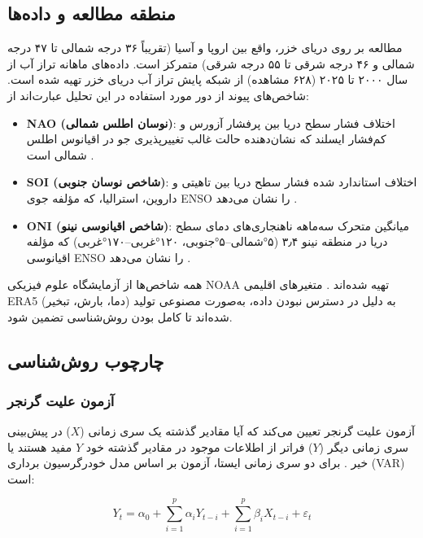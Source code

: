 \documentclass[12pt,a4paper,twocolumn]{article}
\begin{document}
\subsection{منطقه مطالعه و داده‌ها}

مطالعه بر روی دریای خزر، واقع بین اروپا و آسیا (تقریباً ۳۶ درجه شمالی تا ۴۷ درجه شمالی و ۴۶ درجه شرقی تا ۵۵ درجه شرقی) متمرکز است. داده‌های ماهانه تراز آب از سال ۲۰۰۰ تا ۲۰۲۵ (۶۲۸ مشاهده) از شبکه پایش تراز آب دریای خزر تهیه شده است. شاخص‌های پیوند از دور مورد استفاده در این تحلیل عبارت‌اند از:

\begin{itemize}
    \item \textbf{NAO (نوسان اطلس شمالی)}: اختلاف فشار سطح دریا بین پرفشار آزورس و کم‌فشار ایسلند که نشان‌دهنده حالت غالب تغییرپذیری جو در اقیانوس اطلس شمالی است \citep{psl_noaa}.
    \item \textbf{SOI (شاخص نوسان جنوبی)}: اختلاف استاندارد شده فشار سطح دریا بین تاهیتی و داروین، استرالیا، که مؤلفه جوی ENSO را نشان می‌دهد \citep{psl_noaa}.
    \item \textbf{ONI (شاخص اقیانوسی نینو)}: میانگین متحرک سه‌ماهه ناهنجاری‌های دمای سطح دریا در منطقه نینو ۳٫۴ (۵°شمالی–۵°جنوبی، ۱۲۰°غربی–۱۷۰°غربی) که مؤلفه اقیانوسی ENSO را نشان می‌دهد \citep{psl_noaa}.
\end{itemize}

همه شاخص‌ها از آزمایشگاه علوم فیزیکی NOAA تهیه شده‌اند \citep{psl_noaa}. متغیرهای اقلیمی ERA5 (دما، بارش، تبخیر) به دلیل در دسترس نبودن داده، به‌صورت مصنوعی تولید شده‌اند تا کامل بودن روش‌شناسی تضمین شود.

\subsection{چارچوب روش‌شناسی}

\subsubsection{آزمون علیت گرنجر}

آزمون علیت گرنجر تعیین می‌کند که آیا مقادیر گذشته یک سری زمانی ($X$) در پیش‌بینی سری زمانی دیگر ($Y$) فراتر از اطلاعات موجود در مقادیر گذشته خود $Y$ مفید هستند یا خیر \citep{granger1969}. برای دو سری زمانی ایستا، آزمون بر اساس مدل خودرگرسیون برداری (VAR) است:

\begin{equation}
Y_t = \alpha_0 + \sum_{i=1}^{p} \alpha_i Y_{t-i} + \sum_{i=1}^{p} \beta_i X_{t-i} + \varepsilon_t
\end{equation}
\end{document}

